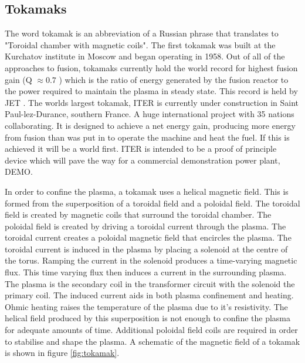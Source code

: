 	\subsection{Tokamaks}
	The word tokamak is an abbreviation of a Russian phrase  that translates to "Toroidal chamber with magnetic coils". The first tokamak was built at the Kurchatov institute in Moscow and began operating in 1958. Out of all of the approaches to fusion, tokamaks currently hold the world record for highest fusion gain (Q $\approx 0.7$ ) which is the ratio of energy generated by the fusion reactor to the power required to maintain the plasma in steady state. This record is held by JET \cite{Q_record}. The worlds largest tokamak, ITER is currently under construction in Saint Paul-lez-Durance, southern France. A huge international project with 35 nations collaborating. It is designed to achieve a net energy gain, producing more energy from fusion than was put in to operate the machine and heat the fuel. If this is achieved it will be a world first. ITER is intended to be a proof of principle device which will pave the way for a commercial demonstration power plant, DEMO.     
	
	
	
	In order to confine the plasma, a tokamak uses a helical magnetic field. This is formed from the superposition of a toroidal field and a poloidal field. The toroidal field is created by magnetic coils that surround the toroidal chamber. The poloidal field is created by driving a toroidal current through the plasma. The toroidal current creates a poloidal magnetic field that encircles the plasma. The toroidal current is induced in the plasma by placing a solenoid at the centre of the torus. Ramping the current in the solenoid produces a time-varying magnetic flux. This time varying flux then induces a current in the surrounding plasma. The plasma is the secondary coil in the transformer circuit with the solenoid the primary coil. The induced current aids in both plasma confinement and heating. Ohmic heating raises the temperature of the plasma due to it's resistivity. The helical field produced by this superposition is not enough to confine the plasma for adequate amounts of time. Additional poloidal field coils are required in order to stabilise and shape the plasma. A schematic of the magnetic field of a tokamak is shown in figure \ref{fig:tokamak}.
	
